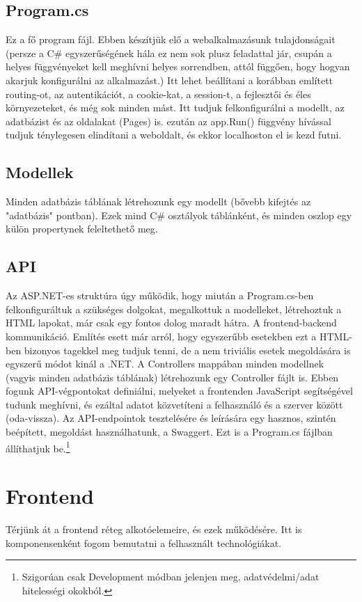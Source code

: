 \subsection{Program.cs}
Ez a fő program fájl. Ebben készítjük
elő a webalkalmazásunk tulajdonságait (persze a C\# egyszerűségének
hála ez nem sok plusz feladattal jár, csupán a helyes függvényeket
kell meghívni helyes sorrendben, attól függően, hogy hogyan
akarjuk konfigurálni az alkalmazást.) Itt lehet beállítani a
korábban említett routing-ot, az autentikációt, a cookie-kat,
a session-t, a fejlesztői és éles környezeteket, és még sok minden mást. Itt tudjuk felkonfigurálni a modellt, az adatbázist
és az oldalakat (Pages) is. ezután az app.Run() függvény hívással
tudjuk ténylegesen elindítani a weboldalt, és ekkor localhoston
el is kezd futni.

\subsection{Modellek}
Minden adatbázis táblának létrehozunk egy modellt
(bővebb kifejtés az "adatbázis" pontban). Ezek mind C\# osztályok
táblánként, és minden oszlop egy külön propertynek feleltethető meg.

\subsection{API}
Az ASP.NET-es struktúra úgy működik, hogy miután a 
Program.cs-ben felkonfiguráltuk a szükséges dolgokat, megalkottuk a modelleket, létrehoztuk a HTML lapokat, már csak
egy fontos dolog maradt hátra. A frontend-backend kommunikáció.
Említés esett már arról, hogy egyszerűbb esetekben ezt a HTML-ben
bizonyos tagekkel meg tudjuk tenni, de a nem triviális esetek
megoldására is egyszerű módot kinál a .NET. A Controllers
mappában minden modellnek (vagyis minden adatbázis táblának)
létrehozunk egy Controller fájlt is. Ebben fogunk API-végpontokat
definiálni, melyeket a frontenden JavaScript segítségével tudunk
meghívni, és ezáltal adatot közvetíteni a felhasználó és a szerver
között (oda-vissza). Az API-endpointok tesztelésére és leírására
egy hasznos, szintén beépített, megoldást használhatunk, a Swaggert.
Ezt is a Program.cs fájlban állíthatjuk be.\footnote{Szigorúan csak 
Development módban jelenjen meg, adatvédelmi/adat hitelességi okokból.}

\section{Frontend}
Térjünk át a frontend réteg alkotóelemeire, és ezek működésére. Itt is komponensenként fogom bemutatni a felhasznált technológiákat.

